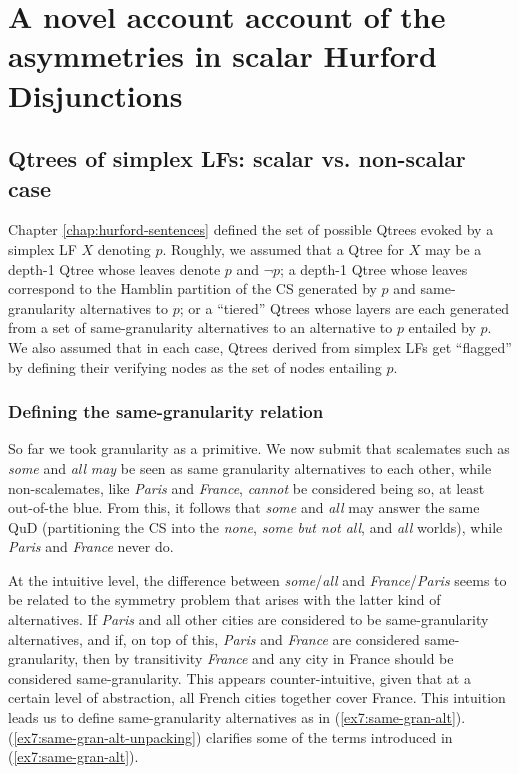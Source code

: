 \section{A novel account account of the asymmetries in scalar Hurford Disjunctions}\label{sec7:asym-account}

\subsection{Qtrees of simplex LFs: scalar vs. non-scalar case}
Chapter \ref{chap:hurford-sentences} defined the set of possible Qtrees evoked by a simplex LF $X$ denoting $p$. Roughly, we assumed that a Qtree for $X$ may be a depth-1 Qtree whose leaves denote $p$ and $\neg p$; a depth-1 Qtree whose leaves correspond to the Hamblin partition of the CS generated by $p$ and same-granularity alternatives to $p$; or a ``tiered'' Qtrees whose layers are each generated from a set of same-granularity alternatives to an alternative to $p$ entailed by $p$. We also assumed that in each case, Qtrees derived from simplex LFs get ``flagged'' by defining their verifying nodes as the set of nodes entailing $p$.


\subsubsection{Defining the same-granularity relation}
So far we took granularity as a primitive. We now submit that scalemates such as \textit{some} and \textit{all} \textit{may} be seen as same granularity alternatives to each other, while non-scalemates, like \textit{Paris} and \textit{France}, \textit{cannot} be considered being so, at least out-of-the blue. From this, it follows that \textit{some} and \textit{all} may answer the same QuD (partitioning the CS into the \textit{none}, \textit{some but not all}, and \textit{all} worlds), while \textit{Paris} and \textit{France} never do.

At the intuitive level, the difference between \textit{some}/\textit{all} and \textit{France}/\textit{Paris} seems to be related to the symmetry problem \citep{Kroch1972,Fox2007} that arises with the latter kind of alternatives. If \textit{Paris} and all other cities are considered to be same-granularity alternatives, and if, on top of this, \textit{Paris} and \textit{France} are considered same-granularity, then by transitivity \textit{France} and any city in France should be considered same-granularity. This appears counter-intuitive, given that at a certain level of abstraction, all French cities together cover France. This intuition leads us to define same-granularity alternatives as in (\ref{ex7:same-gran-alt}). (\ref{ex7:same-gran-alt-unpacking}) clarifies some of the terms introduced in (\ref{ex7:same-gran-alt}).

